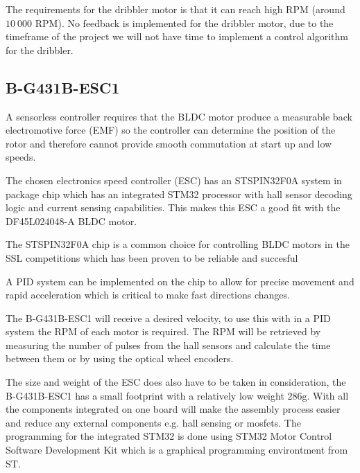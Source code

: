 \documentclass[a4paper,4pt]{article}
\begin{document}
  The requirements for the dribbler motor is that it can reach high RPM
  (around $10\:000\text{ RPM}$). No feedback is implemented for the
  dribbler motor, due to the timeframe of the project we will not have
  time to implement a control algorithm for the dribbler.


  \subsection{B-G431B-ESC1}

  A sensorless controller requires that the BLDC motor produce a
  measurable back electromotive force (EMF) so the controller can
  determine the position of the rotor and therefore cannot provide
  smooth commutation at start up and low speeds.
  \cite{roweInstrumentationControlHigh2012}

  The chosen electronics speed controller (ESC) has an STSPIN32F0A
  system in package chip which has an integrated STM32 processor with
  hall sensor decoding logic and current sensing capabilities. This
  makes this ESC a good fit with the DF45L024048-A BLDC motor.

  The STSPIN32F0A chip is a common choice for controlling BLDC motors in
  the SSL competitions which has been proven to be reliable and
  succesful
  \cite{ryllExtendedTeamDescription}\cite{abousaleh2024TeamDescription}

  A PID system can be implemented on the chip to allow for precise
  movement and rapid acceleration which is critical to make fast
  directions changes.

  The B-G431B-ESC1 will receive a desired velocity, to use this with in
  a PID system the RPM of each motor is required. The RPM will be
  retrieved by measuring the number of pulses from the hall sensors and
  calculate the time between them or by using the optical wheel
  encoders.

  The size and weight of the ESC does also have to be taken in
  consideration, the B-G431B-ESC1 has a small footprint with a
  relatively low weight $286\text{g}$. With all the components
  integrated on one board will make the assembly process easier and
  reduce any external components e.g. hall sensing or mosfets. The
  programming for the integrated STM32 is done using STM32 Motor Control
  Software Development Kit which is a graphical programming environtment
  from ST.
\end{document}
